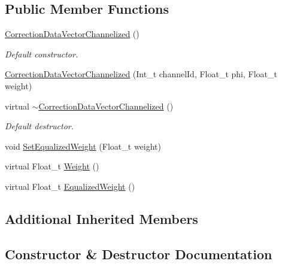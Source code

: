 \subsection*{Public Member Functions}
\begin{DoxyCompactItemize}
\item 
\mbox{\label{classQn_1_1CorrectionDataVectorChannelized_ad020992f1c0d70f6eaaabd4d6997a25b}} 
\mbox{\hyperlink{classQn_1_1CorrectionDataVectorChannelized_ad020992f1c0d70f6eaaabd4d6997a25b}{Correction\+Data\+Vector\+Channelized}} ()
\begin{DoxyCompactList}\small\item\em Default constructor. \end{DoxyCompactList}\item 
\mbox{\hyperlink{classQn_1_1CorrectionDataVectorChannelized_a5e3f5b06e8199d86b9ceab8e97c5e3a3}{Correction\+Data\+Vector\+Channelized}} (Int\+\_\+t channel\+Id, Float\+\_\+t phi, Float\+\_\+t weight)
\item 
\mbox{\label{classQn_1_1CorrectionDataVectorChannelized_a9ca1281cbf59c1bd96b6605bfa0925d4}} 
virtual \mbox{\hyperlink{classQn_1_1CorrectionDataVectorChannelized_a9ca1281cbf59c1bd96b6605bfa0925d4}{$\sim$\+Correction\+Data\+Vector\+Channelized}} ()
\begin{DoxyCompactList}\small\item\em Default destructor. \end{DoxyCompactList}\item 
void \mbox{\hyperlink{classQn_1_1CorrectionDataVectorChannelized_af7f71996404eb417e7e3e006938b0fd9}{Set\+Equalized\+Weight}} (Float\+\_\+t weight)
\item 
virtual Float\+\_\+t \mbox{\hyperlink{classQn_1_1CorrectionDataVectorChannelized_ad1ee46c787ccf5c6537f70f6458c3872}{Weight}} ()
\item 
virtual Float\+\_\+t \mbox{\hyperlink{classQn_1_1CorrectionDataVectorChannelized_a40656c301d6db91a2e761b129d746832}{Equalized\+Weight}} ()
\end{DoxyCompactItemize}
\subsection*{Additional Inherited Members}


\subsection{Constructor \& Destructor Documentation}
\mbox{\label{classQn_1_1CorrectionDataVectorChannelized_a5e3f5b06e8199d86b9ceab8e97c5e3a3}} 
